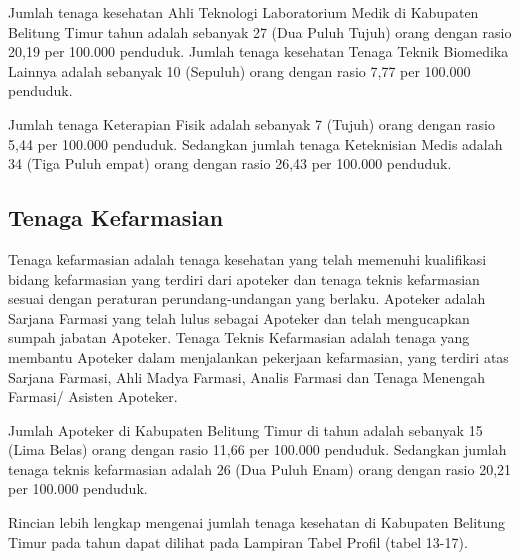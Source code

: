 Jumlah tenaga kesehatan Ahli Teknologi Laboratorium Medik di Kabupaten Belitung Timur tahun
\tP adalah sebanyak 27 (Dua Puluh Tujuh) orang dengan rasio 20,19 per 100.000 penduduk.
Jumlah tenaga kesehatan Tenaga Teknik Biomedika Lainnya adalah sebanyak 10 (Sepuluh) orang dengan rasio 7,77 per 100.000 penduduk.

Jumlah tenaga Keterapian Fisik adalah sebanyak 7 (Tujuh) orang dengan rasio 5,44 per 100.000 penduduk. Sedangkan jumlah tenaga Keteknisian Medis adalah 34 (Tiga Puluh empat) orang dengan rasio 26,43 per 100.000 penduduk.


\subsection{Tenaga Kefarmasian}
Tenaga kefarmasian adalah tenaga kesehatan yang telah memenuhi kualifikasi bidang kefarmasian yang terdiri dari apoteker dan tenaga teknis kefarmasian sesuai dengan peraturan perundang-undangan yang berlaku.
Apoteker adalah Sarjana Farmasi yang telah lulus sebagai Apoteker dan telah mengucapkan sumpah jabatan Apoteker.
Tenaga Teknis Kefarmasian adalah tenaga yang membantu Apoteker dalam menjalankan pekerjaan kefarmasian, yang terdiri atas Sarjana Farmasi, Ahli Madya Farmasi, Analis Farmasi dan Tenaga Menengah Farmasi/ Asisten Apoteker.

Jumlah Apoteker di Kabupaten Belitung Timur di tahun \tP adalah sebanyak 15 (Lima Belas) orang dengan rasio 11,66 per 100.000 penduduk. Sedangkan jumlah tenaga teknis kefarmasian adalah 26 (Dua Puluh Enam) orang dengan rasio 20,21 per 100.000 penduduk.

\vspace{2ex}

Rincian lebih lengkap mengenai jumlah tenaga kesehatan di Kabupaten Belitung Timur pada tahun \tP dapat dilihat pada Lampiran Tabel Profil (tabel 13-17).
